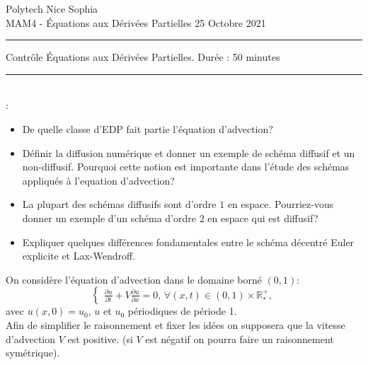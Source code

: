 \documentclass[12pt,a4paper]{article}
\begin{document}
 \hfill Polytech Nice Sophia\\
\noindent MAM4 - \'Equations aux D\'eriv\'ees Partielles \hfill 
25 Octobre 2021 \\

\hrule

\vspace{1cm}
\centerline {\large \sc Contrôle \'Equations aux D\'eriv\'ees Partielles. Dur\'ee : 50 minutes}
\vspace{1cm}


\hrule
\vspace{1cm}
\\

:
\begin{itemize}
\item De quelle classe d'EDP fait partie l'équation d'advection?
\item Définir la diffusion numérique et donner un exemple de schéma diffusif et un non-diffusif.  Pourquoi cette notion est importante dans l'étude des schémas appliqués à l'equation d'advection?
\item La plupart des schémas diffusifs sont d'ordre $1$ en espace. Pourriez-vous donner un exemple d'un schéma d'ordre 2 en espace qui est diffusif?
\item Expliquer quelques différences fondamentales entre le schéma décentré Euler explicite et Lax-Wendroff.
\end{itemize}

\vspace{1cm}
\noindent On considère l'\'equation d'advection dans le domaine born\'e $(0,1)$:
$$
\begin{cases}
\displaystyle\frac{\partial u}{\partial t}+V\frac{\partial u}{\partial
  x}=0,\, \forall (x,t)\in(0,1)\times\mathbb{R}^+_*,
\end{cases}
$$
avec $u(x, 0) = u_0$, $u$ et $u_0$ p\'eriodiques de p\'eriode 1. \\

\noindent Afin de simplifier le raisonnement et fixer les idées on supposera que la vitesse d'advection $V$ est positive. (si $V$ est négatif on pourra faire un raisonnement symétrique).\\


\end{document}
